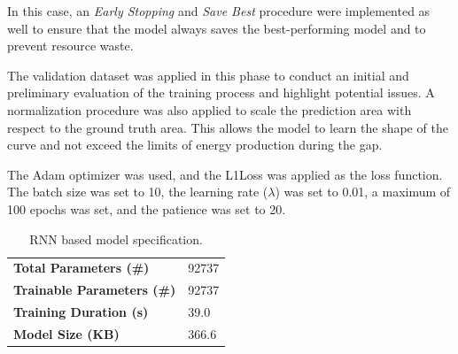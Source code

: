 In this case, an \textit{Early Stopping}\cite{es} and \textit{Save Best} procedure were implemented
as well to ensure that the model always saves the best-performing model and to prevent
resource waste.

The validation dataset was applied in this phase to conduct an initial
and preliminary evaluation of the training process and highlight potential issues.
A normalization procedure was also applied to scale the prediction area with respect
to the ground truth area.
This allows the model to learn the shape of the curve and not exceed the limits
of energy production during the gap.

The Adam\cite{adam} optimizer was used, and the L1Loss\cite{loss} was applied as the loss function.
The batch size was set to 10, the learning rate ($\lambda$) was set to 0.01,
a maximum of 100 epochs was set, and the patience was set to 20.


\begin{table}[H]
	\begin{center}
		\begin{tabular}[c]{l|l}
			\textbf{Total Parameters (\#)}     & 92737 \\
			\textbf{Trainable Parameters (\#)} & 92737 \\
			\textbf{Training Duration (s)}     & 39.0  \\
			\textbf{Model Size (KB)}           & 366.6
		\end{tabular}
	\end{center}
	\caption{RNN based model specification.}\label{tab:ufcnspecs}
\end{table}


